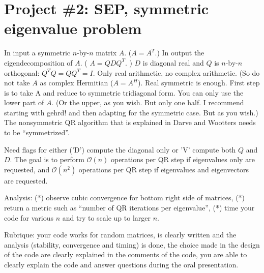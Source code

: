 \documentclass[11pt,letterpaper]{article}
\begin{document}



\section*{Project \#2: SEP, symmetric eigenvalue problem}

In input a symmetric $n$-by-$n$ matrix $A$. ($A=A^T$.) In output the
eigendecomposition of $A$. ( $A = Q D Q^T$. ) $D$ is diagonal real and $Q$ is
$n$-by-$n$ orthogonal: $Q^TQ = QQ^T = I$. Only real arithmetic, no complex
arithmetic. (So do not take $A$ as complex Hermitian ($A=A^H$). Real symmetric
is enough. First step is to take A and reduce to symmetric tridiagonal form.
You can only use the lower part of $A$. (Or the upper, as you wish. But only
one half. I recommend starting with gehrd! and then adapting for the symmetric
case. But as you wish.) The nonsymmetric QR algorithm that is explained in Darve and Wootters 
needs to be ``symmetrized''. 

Need flags for
either ('D') compute the diagonal only or 'V'
compute both $Q$ and $D$. 
The goal is to perform $\mathcal{O}(n)$ operations per QR step if eigenvalues only are requested,
and $\mathcal{O}(n^2)$ operations per QR step if eigenvalues and eigenvectors are requested.

Analysis: (*) observe cubic convergence for bottom right side of matrices,
(*) return a metric such as ``number of QR iterations per eigenvalue'', (*) time
your code for various $n$ and try to scale up to larger $n$.

Rubrique: your code works for random matrices, is clearly written
and the analysis (stability, convergence and timing) is done, the choice made
in the design of the code are clearly explained in the comments of the code, you are able to clearly 
explain the code and answer questions 
during the oral presentation.


\end{document}
